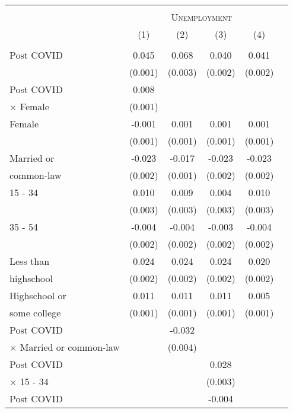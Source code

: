 \begin{tabular*}{\textwidth}{ @{\extracolsep{\fill}}l*{5}{c}}
\hline\hline
\\
& \multicolumn{4}{c}{ \textsc{Unemployment} } \\
                &\multicolumn{1}{c}{(1)}&\multicolumn{1}{c}{(2)}&\multicolumn{1}{c}{(3)}&\multicolumn{1}{c}{(4)}\\
\hline
\\
Post COVID      &    0.045&    0.068&    0.040&    0.041\\
                &  (0.001)&  (0.003)&  (0.002)&  (0.002)\\
[0.5em]
Post COVID      &    0.008&         &         &         \\
$\times$ Female &  (0.001)&         &         &         \\
[0.5em]
Female          &   -0.001&    0.001&    0.001&    0.001\\
                &  (0.001)&  (0.001)&  (0.001)&  (0.001)\\
[0.5em]
Married or      &   -0.023&   -0.017&   -0.023&   -0.023\\
common-law      &  (0.002)&  (0.001)&  (0.002)&  (0.002)\\
[0.5em]
15 - 34         &    0.010&    0.009&    0.004&    0.010\\
                &  (0.003)&  (0.003)&  (0.003)&  (0.003)\\
[0.5em]
35 - 54         &   -0.004&   -0.004&   -0.003&   -0.004\\
                &  (0.002)&  (0.002)&  (0.002)&  (0.002)\\
[0.5em]
Less than       &    0.024&    0.024&    0.024&    0.020\\
highschool      &  (0.002)&  (0.002)&  (0.002)&  (0.002)\\
[0.5em]
Highschool or   &    0.011&    0.011&    0.011&    0.005\\
some college    &  (0.001)&  (0.001)&  (0.001)&  (0.001)\\
[0.5em]
Post COVID      &         &   -0.032&         &         \\
$\times$ Married or common-law&         &  (0.004)&         &         \\
[0.5em]
Post COVID      &         &         &    0.028&         \\
$\times$ 15 - 34&         &         &  (0.003)&         \\
[0.5em]
Post COVID      &         &         &   -0.004&         \\

\end{tabular*}
